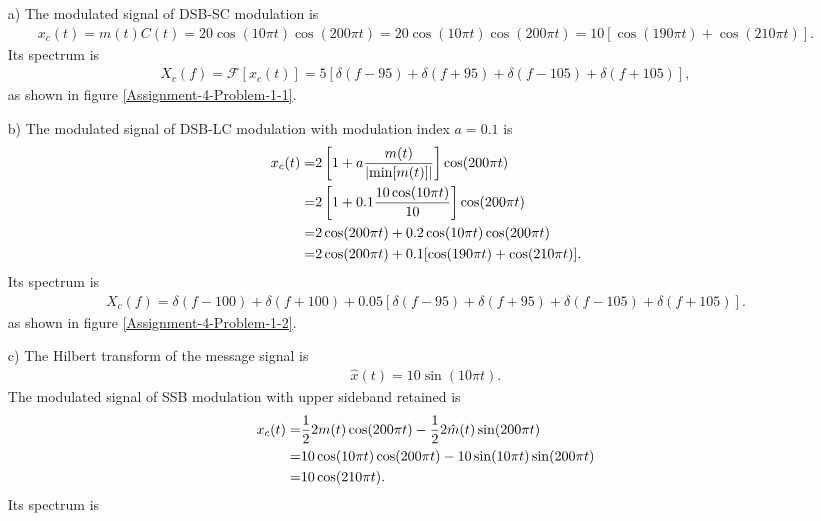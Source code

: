 \documentclass{assignment}
\begin{document}
\begin{sol}
    \begin{itemize}
        \item[a)] The modulated signal of DSB-SC modulation is
        \begin{align}
            x_c(t)=m(t)C(t)=20\cos(10\pi t)\cos(200\pi t)=20\cos(10\pi t)\cos(200\pi t)=10[\cos(190\pi t)+\cos(210\pi t)].
        \end{align}
        Its spectrum is
        \begin{align}
            X_c(f)=\mathscr{F}[x_c(t)]=5[\delta(f-95)+\delta(f+95)+\delta(f-105)+\delta(f+105)],
        \end{align}
        as shown in figure \ref{Assignment-4-Problem-1-1}.
        \item[b)] The modulated signal of DSB-LC modulation with modulation index $a=0.1$ is
        \begin{align}
            \notag x_c(t)=&2\left[1+a\frac{m(t)}{\left\lvert\min[m(t)]\right\rvert}\right]\cos(200\pi t)\\
            \notag=&2\left[1+0.1\frac{10\cos(10\pi t)}{10}\right]\cos(200\pi t)\\
            \notag=&2\cos(200\pi t)+0.2\cos(10\pi t)\cos(200\pi t)\\
            =&2\cos(200\pi t)+0.1[\cos(190\pi t)+\cos(210\pi t)].
        \end{align}
        Its spectrum is
        \begin{align}
            X_c(f)=\delta(f-100)+\delta(f+100)+0.05[\delta(f-95)+\delta(f+95)+\delta(f-105)+\delta(f+105)].
        \end{align}
        as shown in figure \ref{Assignment-4-Problem-1-2}.
        \item[c)] The Hilbert transform of the message signal is
        \begin{align}
            \hat{x}(t)=10\sin(10\pi t).
        \end{align}
        The modulated signal of SSB modulation with upper sideband retained is
        \begin{align}
            \notag x_c(t)=&\frac{1}{2}2m(t)\cos(200\pi t)-\frac{1}{2}2\hat{m}(t)\sin(200\pi t)\\
            \notag=&10\cos(10\pi t)\cos(200\pi t)-10\sin(10\pi t)\sin(200\pi t)\\
            =&10\cos(210\pi t).
        \end{align}
        Its spectrum is
        \begin{align}

\end{align}
\end{itemize}
\end{sol}
\end{document}
